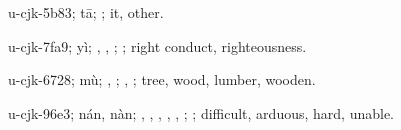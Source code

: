 \begin{multicols}{2}
{\cjkgGlue{}u-cjk-5b83; tā; \cjkgGlue{}; it, other.

\cjkgGlue{}u-cjk-7fa9; yì; \cjkgGlue{}, \cjkgGlue{}, \cjkgGlue{}; \cjkgGlue{}; right conduct, righteousness.

\cjkgGlue{}u-cjk-6728; mù; \cjkgGlue{}, \cjkgGlue{}; \cjkgGlue{}, \cjkgGlue{}; tree, wood, lumber, wooden.

\cjkgGlue{}u-cjk-96e3; nán, nàn; \cjkgGlue{}\cjkgGlue{}\cjkgGlue{}, \cjkgGlue{}\cjkgGlue{}\cjkgGlue{}, \cjkgGlue{}\cjkgGlue{}\cjkgGlue{}, \cjkgGlue{}\cjkgGlue{}\cjkgGlue{}, \cjkgGlue{}\cjkgGlue{}\cjkgGlue{}, \cjkgGlue{}\cjkgGlue{}\cjkgGlue{}; \cjkgGlue{}; difficult, arduous, hard, unable.

}
\end{multicols}
